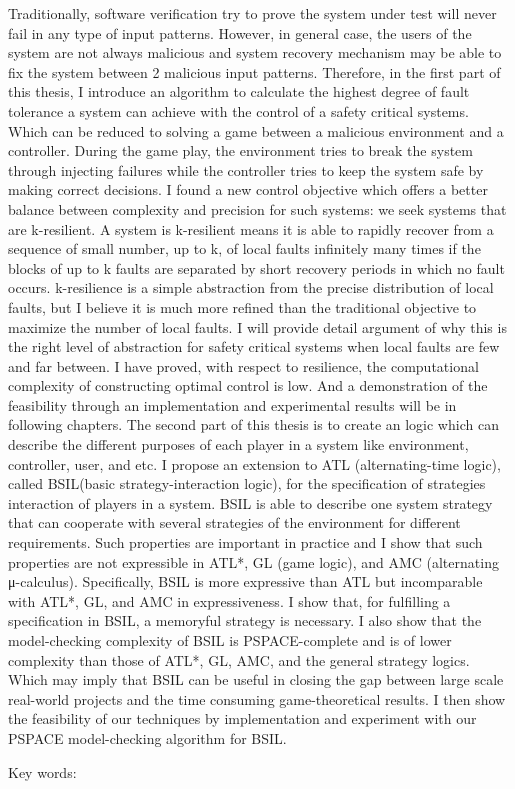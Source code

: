 \begin{abstractEN}

Traditionally, software verification try to prove the system under test will never fail in any type of input patterns. However, in general case, the users of the system are not always malicious and system recovery mechanism may be able to fix the system between 2 malicious input patterns. 
Therefore, in the first part of this thesis, I introduce an algorithm to calculate the highest degree of fault tolerance a system can achieve with the control of a safety critical systems. Which can be reduced to solving a game between a malicious environment and a controller. During the game play, the environment tries to break the system through injecting failures while the controller tries to keep the system safe by making correct decisions. I found a new control objective which offers a better balance between complexity and precision for such systems: we seek systems that are k-resilient. A system is k-resilient means it is able to rapidly recover from a sequence of small number, up to k, of local faults infinitely many times if the blocks of up to k faults are separated by short recovery periods in which no fault occurs. k-resilience is a simple abstraction from the precise distribution of local faults, but I believe it is much more refined than the traditional objective to maximize the number of local faults. I will provide detail argument of why this is the right level of abstraction for safety critical systems when local faults are few and far between. I have proved, with respect to resilience, the computational complexity of constructing optimal control is low. And a demonstration of the feasibility through an implementation and experimental results will be in following chapters.
The second part of this thesis is to create an logic which can describe the different purposes of each player in a system like environment, controller, user, and etc. I propose an extension to ATL (alternating-time logic), called BSIL(basic strategy-interaction logic), for the specification of strategies interaction of players in a system. BSIL is able to describe one system strategy that can cooperate with several strategies of the environment for different requirements. Such properties are important in practice and I show that such properties are not expressible in ATL*, GL (game logic), and AMC (alternating μ-calculus). Specifically, BSIL is more expressive than ATL but incomparable with ATL*, GL, and AMC in expressiveness. I show that, for fulfilling a specification in BSIL, a memoryful strategy is necessary. I also show that the model-checking complexity of BSIL is PSPACE-complete and is of lower complexity than those of ATL*, GL, AMC, and the general strategy logics. Which may imply that BSIL can be useful in closing the gap between large scale real-world projects and the time consuming game-theoretical results. I then show the feasibility of our techniques by implementation and experiment with our PSPACE model-checking algorithm for BSIL.


Key words:

\end{abstractEN}
